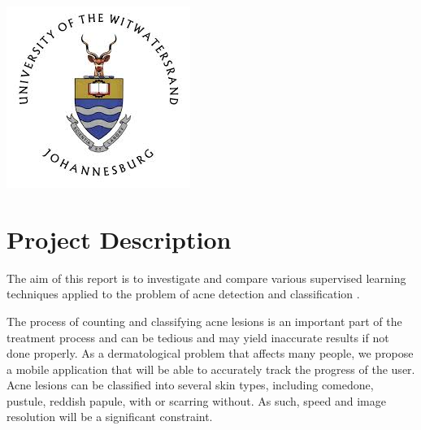 \begin{titlepage}




\includegraphics{logo.jpeg}\\[1cm] %
 

\vfill %

\end{titlepage}


\section*{Project Description}
The aim of this report is to investigate and compare various supervised learning techniques applied to the problem of acne detection and classification \cite{mobile}. \\ \medskip 

The process of counting and classifying acne lesions is an important part of the treatment process and can be tedious and may yield inaccurate results if not done properly. As a dermatological problem that affects many people\cite{pathogens}, we propose a mobile application that will be able to accurately track the progress of the user. Acne lesions can be classified into several skin types, including comedone, pustule, reddish papule, with or scarring without. \cite{mobile} As such, speed and image resolution will be a significant constraint. \\ \medskip

